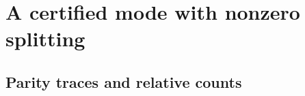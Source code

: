 \documentclass[11pt,a4paper]{article}
\theoremstyle{definition}
\numberwithin{equation}{section}
\begin{document}
\section{A certified mode with nonzero splitting}\label{unified:sec:certificate}
\begingroup
\let\section\subsection
\let\subsection\subsubsection



\endgroup
\section{Parity traces and relative counts}\label{unified:sec:parity}
\begingroup
\let\section\subsection
\let\subsection\subsubsection

\endgroup



\end{document}
